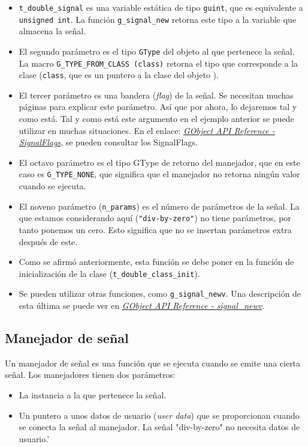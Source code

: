 \begin{itemize}
  \tightlist
\item \texttt{t\_double\_signal} es una variable estática de tipo \texttt{guint}, que es equivalente a
  \texttt{unsigned int}. La función \texttt{g\_signal\_new} retorna este tipo a la variable que almacena la
  señal. 
\item El segundo parámetro es el tipo \texttt{GType} del objeto al que pertenece la señal.
  La macro \texttt{G\_TYPE\_FROM\_CLASS (class)} retorna el tipo que corresponde a la clase (\texttt{class},
  que es un puntero a la clase del objeto \footnotemark{}).
\item El tercer parámetro es una bandera (\emph{flag}) de la señal. Se necesitan muchas páginas para
  explicar este parámetro. Así que por ahora, lo dejaremos tal y como está. Tal y como está este argumento
  en el ejemplo anterior se puede utilizar en muchas situaciones. En el enlace:
  \href{https://docs.gtk.org/gobject/flags.SignalFlags.html}
  {\emph{\textsf{GObject API Reference  - SignalFlags}}},
  se pueden consultar los \textsf{SignalFlags}.
\item El octavo parámetro es el tipo \textsf{GType} de retorno del manejador, que en este caso es
  \texttt{G\_TYPE\_NONE}, que significa que el manejador no retorna ningún valor cuando se ejecuta.
\item El noveno parámetro (\texttt{n\_params}) es el número de parámetros de la señal. La que
  estamos considerando aquí (\texttt{"div-by-zero"}) no tiene parámetros, por tanto ponemos un cero.
  Esto significa que no se insertan parámetros extra después de este.
\item Como se afirmó anteriormente, esta función se debe poner en la función de inicialización de la
  clase (\texttt{t\_double\_class\_init}).
\item Se pueden utilizar otras funciones, como \texttt{g\_signal\_newv}. Una descripción de esta
  última se puede ver en
  \href{https://docs.gtk.org/gobject/func.signal_newv.html}
  {\emph{\textsf{GObject API Reference - signal\_newv}}}.      
\end{itemize}

\subsection{Manejador de señal}
Un manejador de señal es una función que se ejecuta cuando se emite una cierta señal. Los manejadores
tienen dos parámetros:
\begin{itemize}
  \tightlist
\item La instancia a la que pertenece la señal.
\item Un puntero a unos datos de usuario (\emph{user data}) que se proporcionan cuando se conecta
  la señal al manejador. La señal \textsf{"div-by-zero"} no necesita datos de usuario.'
\end{itemize}

